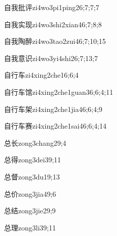 \begin{verbete}{自我批评}{zi4wo3pi1ping2}{6;7;7;7}
\end{verbete}
\begin{verbete}{自我实现}{zi4wo3shi2xian4}{6;7;8;8}
\end{verbete}
\begin{verbete}{自我陶醉}{zi4wo3tao2zui4}{6;7;10;15}
\end{verbete}
\begin{verbete}{自我意识}{zi4wo3yi4shi2}{6;7;13;7}
\end{verbete}
\begin{verbete}{自行车}{zi4xing2che1}{6;6;4}
\end{verbete}
\begin{verbete}{自行车馆}{zi4xing2che1guan3}{6;6;4;11}
\end{verbete}
\begin{verbete}{自行车架}{zi4xing2che1jia4}{6;6;4;9}
\end{verbete}
\begin{verbete}{自行车赛}{zi4xing2che1sai4}{6;6;4;14}
\end{verbete}
\begin{verbete}{总长}{zong3chang2}{9;4}
\end{verbete}
\begin{verbete}{总得}{zong3dei3}{9;11}
\end{verbete}
\begin{verbete}{总督}{zong3du1}{9;13}
\end{verbete}
\begin{verbete}{总价}{zong3jia4}{9;6}
\end{verbete}
\begin{verbete}{总结}{zong3jie2}{9;9}
\end{verbete}
\begin{verbete}{总理}{zong3li3}{9;11}
\end{verbete}
